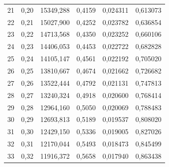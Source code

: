 \begin{exemple}
\begin{center}
\begin{tabular}{S[table-format=2.0]S[table-format=1.2]
				S[table-format=5.3]S[table-format=1.4]
				S[table-format=1.6]S[table-format=1.6]}
			21  &  0,20  &  15349,288  &  0,4159  &  0,024311  &  0,613073 \\
			22  &  0,21  &  15027,900  &  0,4252  &  0,023782  &  0,636854 \\
			23  &  0,22  &  14713,568  &  0,4350  &  0,023252  &  0,660106 \\
			24  &  0,23  &  14406,053  &  0,4453  &  0,022722  &  0,682828 \\
			25  &  0,24  &  14105,147  &  0,4561  &  0,022192  &  0,705020 \\
			26  &  0,25  &  13810,667  &  0,4674  &  0,021662  &  0,726682 \\
			27  &  0,26  &  13522,444  &  0,4792  &  0,021131  &  0,747813 \\
			28  &  0,27  &  13240,324  &  0,4918  &  0,020600  &  0,768414 \\
			29  &  0,28  &  12964,160  &  0,5050  &  0,020069  &  0,788483 \\
			30  &  0,29  &  12693,813  &  0,5189  &  0,019537  &  0,808020 \\
			31  &  0,30  &  12429,150  &  0,5336  &  0,019005  &  0,827026 \\
			32  &  0,31  &  12170,044  &  0,5493  &  0,018473  &  0,845499 \\
			33  &  0,32  &  11916,372  &  0,5658  &  0,017940  &  0,863438 \\
 			\midrule
		\end{tabular}
	\end{center}
	

\end{exemple}
